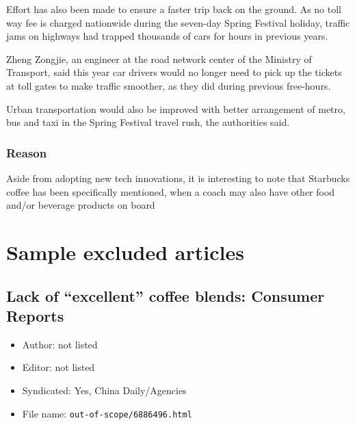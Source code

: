 \begin{displayquote}
	Effort has also been made to ensure a faster trip back on the ground. As
	no toll way fee is charged nationwide during the seven-day Spring
	Festival holiday, traffic jams on highways had trapped thousands of cars
	for hours in previous years.

	Zheng Zongjie, an engineer at the road network center of the Ministry of
	Transport, said this year car drivers would no longer need to pick up
	the tickets at toll gates to make traffic smoother, as they did during
	previous free-hours.

	Urban transportation would also be improved with better arrangement of
	metro, bus and taxi in the Spring Festival travel rush, the authorities
	said.

\end{displayquote}

\subsection{Reason}

Aside from adopting new tech innovations, it is interesting to note that
Starbucks coffee has been specifically mentioned, when a coach may also have
other food and/or beverage products on board

\chapter{Sample excluded articles}\label{appdx:news-articles-ninc}

\section{Lack of ``excellent'' coffee blends: Consumer Reports}

\begin{itemize}
	\item Author: not listed
	\item Editor: not listed
	\item Syndicated: Yes, China Daily/Agencies
	\item File name: \texttt{out-of-scope/6886496.html}
\end{itemize}


